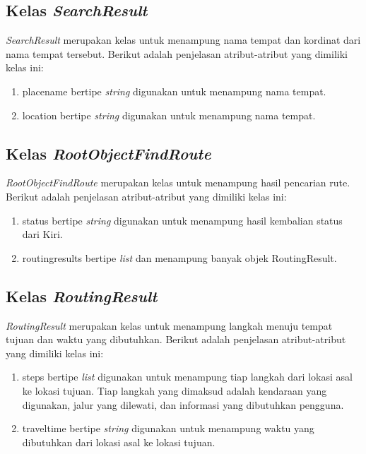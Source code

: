 \subsection{Kelas \textit{SearchResult}}
\label{lab:Kelas SearchResult}
\hspace{0.5cm} \textit{SearchResult} merupakan kelas untuk menampung nama tempat dan kordinat dari nama tempat tersebut. Berikut adalah penjelasan atribut-atribut yang dimiliki kelas ini:
\begin{enumerate}
	\item placename bertipe \textit{string} digunakan untuk menampung nama tempat. 
	\item location bertipe \textit{string} digunakan untuk menampung nama tempat.
\end{enumerate}

\subsection{Kelas \textit{RootObjectFindRoute}}
\label{lab:Kelas RootObjectFindRoute}
\hspace{0.5cm} \textit{RootObjectFindRoute} merupakan kelas untuk menampung hasil pencarian rute. Berikut adalah penjelasan atribut-atribut yang dimiliki kelas ini:
\begin{enumerate}
	\item status bertipe \textit{string} digunakan untuk menampung hasil kembalian status dari Kiri.
	\item routingresults bertipe \textit{list} dan menampung banyak objek RoutingResult.
\end{enumerate}

\subsection{Kelas \textit{RoutingResult}}
\label{lab:Kelas RoutingResult}
\hspace{0.5cm} \textit{RoutingResult} merupakan kelas untuk menampung langkah menuju tempat tujuan dan waktu yang dibutuhkan. Berikut adalah penjelasan atribut-atribut yang dimiliki kelas ini:
\begin{enumerate}
	\item steps bertipe \textit{list} digunakan untuk menampung tiap langkah dari lokasi asal ke lokasi tujuan. Tiap langkah yang dimaksud adalah kendaraan yang digunakan, jalur yang dilewati, dan informasi yang dibutuhkan pengguna.
	\item traveltime bertipe \textit{string} digunakan untuk menampung waktu yang dibutuhkan dari lokasi asal ke lokasi tujuan.
\end{enumerate}

